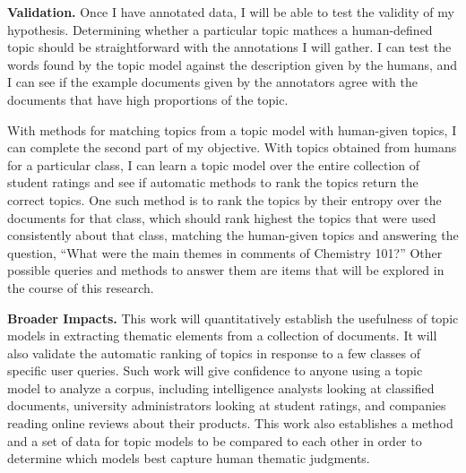 \documentclass[onecolumn, 12pt]{article}
\begin{document}
\textbf{Validation.}  Once I have annotated data, I will be able to test the
validity of my hypothesis.  Determining whether a particular topic mathces a
human-defined topic should be straightforward with the annotations I will
gather.  I can test the words found by the topic model against the description
given by the humans, and I can see if the example documents given by the
annotators agree with the documents that have high proportions of the topic.

With methods for matching topics from a topic model with human-given topics, I
can complete the second part of my objective.  With topics obtained from humans
for a particular class, I can learn a topic model over the entire collection of
student ratings and see if automatic methods to rank the topics return the
correct topics.  One such method is to rank the topics by their entropy over
the documents for that class, which should rank highest the topics that were
used consistently about that class, matching the human-given topics and
answering the question, ``What were the main themes in comments of Chemistry
101?''  Other possible queries and methods to answer them are items that will
be explored in the course of this research.

\textbf{Broader Impacts.}  This work will quantitatively establish the
usefulness of topic models in extracting thematic elements from a collection of
documents.  It will also validate the automatic ranking of topics in response
to a few classes of specific user queries.  Such work will give confidence to
anyone using a topic model to analyze a corpus, including intelligence analysts
looking at classified documents, university administrators looking at student
ratings, and companies reading online reviews about their products.  This work
also establishes a method and a set of data for topic models to be compared to
each other in order to determine which models best capture human thematic
judgments.

\footnotesize

\renewcommand\bibsection{\noindent \small\textbf{References}\vspace{-2mm}\footnotesize}

\end{document}
